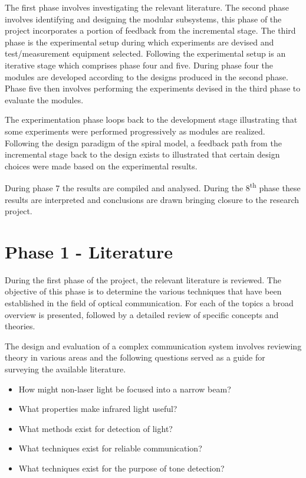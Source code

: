 The first phase involves investigating the relevant literature. The second phase involves identifying and designing the modular subsystems, this phase of the project incorporates a portion of feedback from the incremental stage. The third phase is the experimental setup during which experiments are devised and test/measurement equipment selected. Following the experimental setup is an iterative stage which comprises phase four and five. During phase four the modules are developed according to the designs produced in the second phase. Phase five then involves performing the experiments devised in the third phase to evaluate the modules.

The experimentation phase loops back to the development stage illustrating that some experiments were performed progressively as modules are realized. Following the design paradigm of the spiral model, a feedback path from the incremental stage back to the design exists to illustrated that certain design choices were made based on the experimental results.

During phase 7 the results are compiled and analysed. During the 8\textsuperscript{th} phase these results are interpreted and conclusions are drawn bringing closure to the research project.


\section{Phase 1 - Literature}

During the first phase of the project, the relevant literature is reviewed. The objective of this phase is to determine the various techniques that have been established in the field of optical communication. For each of the topics a broad overview is presented, followed by a detailed review of specific concepts and theories.

The design and evaluation of a complex communication system involves reviewing theory in various areas and the following questions served as a guide for surveying the available literature.

\begin{itemize}
	\item How might non-laser light be focused into a narrow beam? %
	\item What properties make infrared light useful? %
	\item What methods exist for detection of light? %
	\item What techniques exist for reliable communication? %
	\item What techniques exist for the purpose of tone detection? %
\end{itemize}

